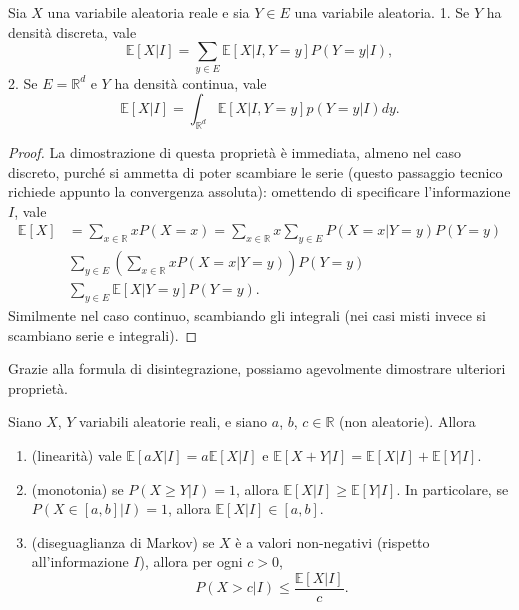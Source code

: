 \documentclass[
  italian,
  letterpaper,
]{book}
\providecommand{\tightlist}{%
  \setlength{\itemsep}{0pt}\setlength{\parskip}{0pt}}
\newcommand{\bra}[1]{\left( #1 \right)}
\newcommand{\sqa}[1]{\left[ #1 \right]}
\newcommand{\R}{\mathbb{R}}
\newcommand{\E}[1]{\mathbb{E}\sqa{#1}}
\theoremstyle{definition}
\theoremstyle{remark}
\begin{document}
Sia \(X\) una variabile aleatoria reale e sia \(Y \in E\) una variabile
aleatoria. 1. Se \(Y\) ha densità discreta, vale
\[ \E{X|I}= \sum_{y \in E} \E{X|I, Y=y} P(Y=y|I),\] 2. Se \(E = \R^d\) e
\(Y\) ha densità continua, vale
\[ \E{X|I} = \int_{\R^d }\E{X|I, Y=y} p(Y=y|I) dy.\]

\begin{proof}
La dimostrazione di questa proprietà è immediata, almeno nel caso
discreto, purché si ammetta di poter scambiare le serie (questo
passaggio tecnico richiede appunto la convergenza assoluta): omettendo
di specificare l'informazione \(I\), vale \[ \begin{split} 
\E{X} & = \sum_{x \in \R} x P(X=x) = \sum_{x \in \R} x \sum_{y\in E} P(X=x|Y=y)P(Y=y)\\
&\sum_{y \in E} \bra{ \sum_{x \in \R} x  P(X=x|Y=y)}P(Y=y)\\
& \sum_{y \in E} \E{X | Y=y} P(Y=y).
\end{split}\] Similmente nel caso continuo, scambiando gli integrali
(nei casi misti invece si scambiano serie e integrali).
\end{proof}

Grazie alla formula di disintegrazione, possiamo agevolmente dimostrare
ulteriori proprietà.

Siano \(X\), \(Y\) variabili aleatorie reali, e siano \(a\), \(b\),
\(c \in \R\) (non aleatorie). Allora

\begin{enumerate}
\def\labelenumi{\arabic{enumi}.}
\tightlist
\item
  (linearità) vale \(\E{aX|I} = a \E{X|I}\) e
  \(\E{X+Y|I }= \E{X|I} + \E{Y|I}\).
\item
  (monotonia) se \(P( X \ge Y|I) = 1\), allora \(\E{X|I} \ge \E{Y|I}\).
  In particolare, se \(P(X\in[a,b]|I) = 1\), allora
  \(\E{X|I} \in [a,b]\).
\item
  (diseguaglianza di Markov) se \(X\) è a valori non-negativi (rispetto
  all'informazione \(I\)), allora per ogni \(c>0\),
  \[ P(X > c|I) \le \frac{ \E{X|I}}{c}.\]
\end{enumerate}
\end{document}
